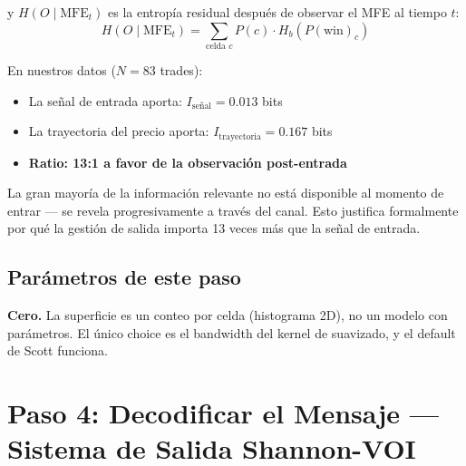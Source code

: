 \documentclass[11pt,a4paper]{article}
\newcommand{\pw}{P(\text{win})}
\begin{document}
y $H(O \mid \text{MFE}_t)$ es la entrop\'ia residual despu\'es de
observar el MFE al tiempo $t$:
\begin{equation}
H(O \mid \text{MFE}_t) = \sum_{\text{celda } c} P(c) \cdot H_b\!\left(\pw_c\right)
\end{equation}

\begin{tcolorbox}[result, title=Resultado emp\'irico: ratio 13:1]
En nuestros datos ($N=83$ trades):
\begin{itemize}[leftmargin=1.5em]
\item La se\~nal de entrada aporta: $I_{\text{se\~nal}} = 0.013$ bits
\item La trayectoria del precio aporta: $I_{\text{trayectoria}} = 0.167$ bits
\item \textbf{Ratio: 13:1 a favor de la observaci\'on post-entrada}
\end{itemize}

La gran mayor\'ia de la informaci\'on relevante no est\'a disponible
al momento de entrar --- se revela progresivamente a trav\'es del canal.
Esto justifica formalmente por qu\'e la gesti\'on de salida importa
13 veces m\'as que la se\~nal de entrada.
\end{tcolorbox}

\subsection{Par\'ametros de este paso}

\textbf{Cero.} La superficie es un conteo por celda (histograma 2D),
no un modelo con par\'ametros. El \'unico choice es el bandwidth del
kernel de suavizado, y el default de Scott funciona.


\section{Paso 4: Decodificar el Mensaje --- Sistema de Salida Shannon-VOI}
\label{sec:paso4}
\end{document}
